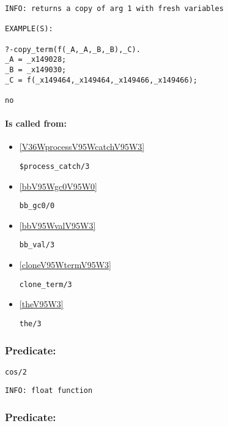 {\small \begin{verbatim}
INFO: returns a copy of arg 1 with fresh variables

EXAMPLE(S):

?-copy_term(f(_A,_A,_B,_B),_C).
_A = _x149028;
_B = _x149030;
_C = f(_x149464,_x149464,_x149466,_x149466);

no

\end{verbatim}}
\paragraph{Is called from:} 
\begin{itemize}
\item \ref{V36WprocessV95WcatchV95W3} 
\begin{verbatim}
$process_catch/3
\end{verbatim}

\item \ref{bbV95Wgc0V95W0} 
\begin{verbatim}
bb_gc0/0
\end{verbatim}

\item \ref{bbV95WvalV95W3} 
\begin{verbatim}
bb_val/3
\end{verbatim}

\item \ref{cloneV95WtermV95W3} 
\begin{verbatim}
clone_term/3
\end{verbatim}

\item \ref{theV95W3} 
\begin{verbatim}
the/3
\end{verbatim}

\end{itemize}

\subsubsection{Predicate:} \label{cosV95W2}

\begin{verbatim}
cos/2
\end{verbatim}

{\small \begin{verbatim}
INFO: float function

\end{verbatim}}

\subsubsection{Predicate:} \label{countV95WtermsV95W2}

